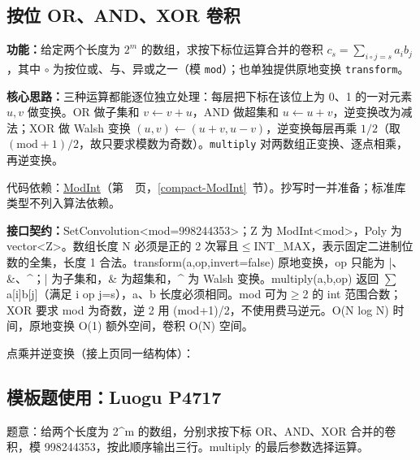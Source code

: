 \subsection{按位 OR、AND、XOR 卷积}\label{compact-SetConvolution}

\noindent\textbf{功能：}\allowbreak 给定两个长度为 $2^m$ 的数组，求按下标位运算合并的卷积 $c_s=\sum_{i\circ j=s}a_ib_j$，其中 $\circ$ 为按位或、与、异或之一（模 \texttt{mod}）；也单独提供原地变换 \texttt{transform}。

\textbf{核心思路：}\allowbreak 三种运算都能逐位独立处理：每层把下标在该位上为 0、1 的一对元素 $u,v$ 做变换。OR 做子集和 $v\leftarrow v+u$，AND 做超集和 $u\leftarrow u+v$，逆变换改为减法；XOR 做 Walsh 变换 $(u,v)\leftarrow(u+v,u-v)$，逆变换每层再乘 $1/2$（取 $(\mathrm{mod}+1)/2$，故只要求模数为奇数）。\texttt{multiply} 对两数组正变换、逐点相乘，再逆变换。

代码依赖：\hyperref[compact-ModInt]{ModInt}（第~\pageref{compact-ModInt}~页，\ref{compact-ModInt}~节）。抄写时一并准备；标准库类型不列入算法依赖。

{\sloppy{}\noindent\textbf{接口契约：}SetConvolution<mod=998244353>；Z 为 ModInt<mod>，Poly 为 vector<Z>。数组长度 N 必须是正的 2 次幂且$\le$INT\_MAX，表示固定二进制位数的全集，长度 1 合法。transform(a,op,invert=false) 原地变换，op 只能为 |、\&、\textasciicircum{}；| 为子集和，\& 为超集和，\textasciicircum{} 为 Walsh 变换。multiply(a,b,op) 返回 $\sum$ a[i]b[j]（满足 i op j=s），a、b 长度必须相同。mod 可为$\ge$2 的 int 范围合数；XOR 要求 mod 为奇数，逆 2 用 (mod+1)/2，不使用费马逆元。O(N log N) 时间，原地变换 O(1) 额外空间，卷积 O(N) 空间。\par}

\Needspace{519pt}



\newpage

\noindent 点乘并逆变换（接上页同一结构体）：



\Needspace{441pt}

\subsection*{模板题使用：Luogu P4717}

\label{usage-example-27}

题意：给两个长度为 2\textasciicircum{}m 的数组，分别求按下标 OR、AND、XOR 合并的卷积，模 998244353，按此顺序输出三行。multiply 的最后参数选择运算。

